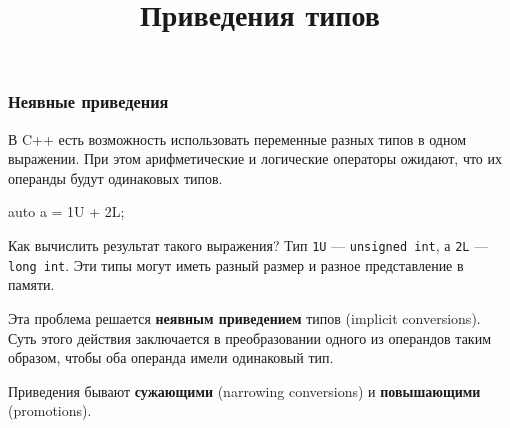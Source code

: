 \documentclass[compress, 8pt, aspectratio=169]{beamer}
\title{Приведения типов}
\begin{document}
\frame[plain]{\titlepage}

\begin{frame}[fragile]

    \frametitle{Неявные приведения}

    \hfill\break
    В C++ есть возможность использовать переменные разных типов в одном выражении.
    При этом арифметические и логические операторы ожидают, что их операнды будут
    одинаковых типов.

    \begin{myinplacelisting}[minted language=cpp]
auto a = 1U + 2L;
    \end{myinplacelisting}

    Как вычислить результат такого выражения?
    Тип \verb|1U| --- \verb|unsigned int|\footnotemark{}, а \verb|2L| ---
    \verb|long int|.
    Эти типы могут иметь разный размер и разное представление в памяти.


    \hfill\break
    Эта проблема решается \textbf{неявным приведением}\footnotemark{} типов
    (implicit conversions).
    Суть этого действия заключается в преобразовании одного из операндов таким образом,
    чтобы оба операнда имели одинаковый тип.

    \hfill\break
    Приведения бывают \textbf{сужающими} (narrowing conversions) и \textbf{повышающими}
    (promotions).


\end{frame}
\end{document}
